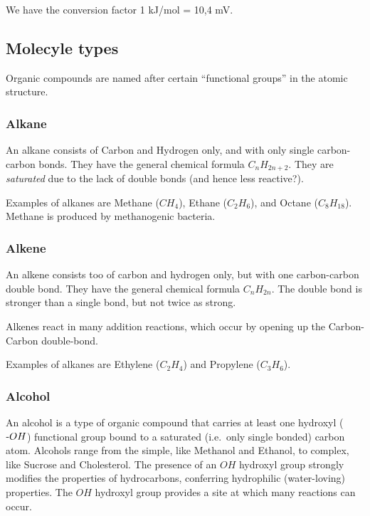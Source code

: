 \documentclass[a4paper,14pt]{extarticle}
\def\mhyphen{{\hbox{-}}}
\begin{document}
We have the conversion factor 1 kJ/mol = 10,4 mV.

\subsection{Molecyle types}

Organic compounds are named after certain ``functional groups'' in the atomic structure.

\subsubsection{Alkane}

An alkane consists of Carbon and Hydrogen only, and with only single carbon-carbon bonds.
They have the general chemical formula $C_{n}H_{2n+2}$. They are {\em saturated\/}
due to the lack of double bonds (and hence less reactive?).

Examples of alkanes are Methane ($CH_4$), Ethane ($C_2H_6$), and Octane ($C_{8}H_{18}$).
Methane is produced by methanogenic bacteria.

\subsubsection{Alkene}

An alkene consists too of carbon and hydrogen only, but with one carbon-carbon double bond.
They have the general chemical formula $C_{n}H_{2n}$. The double bond is stronger than
a single bond, but not twice as strong.

Alkenes react in many addition reactions, which occur by opening up the Carbon-Carbon
double-bond.

Examples of alkanes are Ethylene ($C_2H_4$) and Propylene ($C_3H_6$).

\subsubsection{Alcohol}

An alcohol is a type of organic compound that carries at least one hydroxyl
(${\mhyphen}OH$) functional group bound to a saturated (i.e.\ only single bonded) carbon
atom. Alcohols range from the simple, like Methanol and Ethanol, to complex, like Sucrose
and Cholesterol. The presence of an $OH$ hydroxyl group strongly modifies the properties
of hydrocarbons, conferring hydrophilic (water-loving) properties. The $OH$ hydroxyl group
provides a site at which many reactions can occur.
\end{document}
